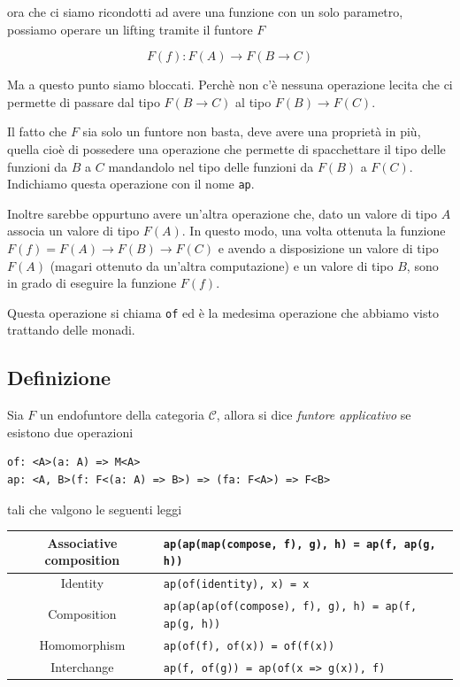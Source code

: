 \documentclass[12pt]{article}
\begin{document}
ora che ci siamo ricondotti ad avere una funzione con un solo parametro, possiamo operare un lifting tramite il funtore $F$

$$
F(f): F(A) \rightarrow F(B \rightarrow C)
$$

Ma a questo punto siamo bloccati.
Perchè non c'è nessuna operazione lecita che ci permette di passare dal tipo $F(B \rightarrow C)$ al tipo $F(B) \rightarrow F(C)$.

Il fatto che $F$ sia solo un funtore non basta, deve avere una proprietà in più, quella cioè di possedere una operazione che permette di
spacchettare il tipo delle funzioni da $B$ a $C$ mandandolo nel tipo delle funzioni da $F(B)$ a $F(C)$.
Indichiamo questa operazione con il nome \texttt{ap}.

Inoltre sarebbe oppurtuno avere un'altra operazione che, dato un valore di tipo $A$ associa un valore di tipo $F(A)$.
In questo modo, una volta ottenuta la funzione $F(f) = F(A) \rightarrow F(B) \rightarrow F(C)$ e avendo a disposizione un valore di tipo $F(A)$
(magari ottenuto da un'altra computazione) e un valore di tipo $B$, sono in grado di eseguire la funzione $F(f)$.

Questa operazione si chiama \texttt{of} ed è la medesima operazione che abbiamo visto trattando delle monadi.

\subsection{Definizione}

Sia $F$ un endofuntore della categoria $\mathcal{C}$, allora si dice \emph{funtore applicativo} se esistono due operazioni

\begin{verbatim}
of: <A>(a: A) => M<A>
ap: <A, B>(f: F<(a: A) => B>) => (fa: F<A>) => F<B>
\end{verbatim}

tali che valgono le seguenti leggi

\begin{center}
\bgroup
\def\arraystretch{1.5}
\begin{tabular}{ |c|p{10cm}| }
\hline
Associative composition & \texttt{ap(ap(map(compose, f), g), h) = ap(f, ap(g, h))} \\
\hline
Identity & \texttt{ap(of(identity), x) = x} \\
\hline
Composition & \texttt{ap(ap(ap(of(compose), f), g), h) = ap(f, ap(g, h))} \\
\hline
Homomorphism & \texttt{ap(of(f), of(x)) = of(f(x))} \\
\hline
Interchange & \texttt{ap(f, of(g)) = ap(of(x => g(x)), f)} \\
\hline
\end{tabular}
\egroup
\end{center}
\end{document}
